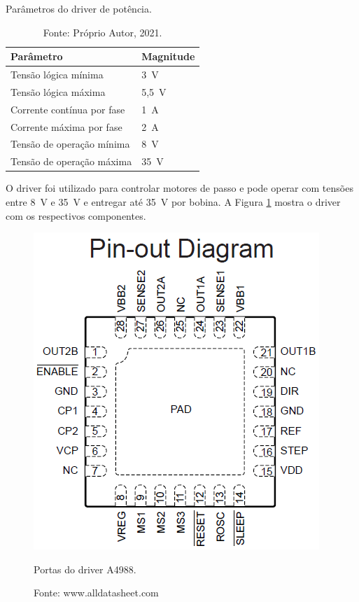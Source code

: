 \begin{table}[H]
    \footnotesize
    \centering
    \caption{Parâmetros do driver de potência.}
    \begin{tabular}{ll}
        \hline
        \textbf{Parâmetro} & \textbf{Magnitude}\\
        \hline
        Tensão lógica mínima & 3~V\\
        Tensão lógica máxima & 5,5~V\\
        Corrente contínua por fase & 1~A\\
        Corrente máxima por fase & 2~A\\
        Tensão de operação mínima & 8~V\\
        Tensão de operação máxima & 35~V\\ 
        \hline       
    \end{tabular}
    \caption*{Fonte: Próprio Autor, 2021.}
    \label{tab:pdriver}
\end{table}

O driver foi utilizado para controlar motores de passo e pode operar com tensões entre 8~V e 35~V e 
entregar até 35~V por bobina. A Figura \ref{fig:driverportas} mostra o driver com os respectivos componentes.

\begin{figure}[H]
\centering
\includegraphics[scale = 0.75]{figuras/driverportas}
\caption{Portas do driver A4988.}
\caption*{Fonte: www.alldatasheet.com}
\label{fig:driverportas}
\end{figure}
    
